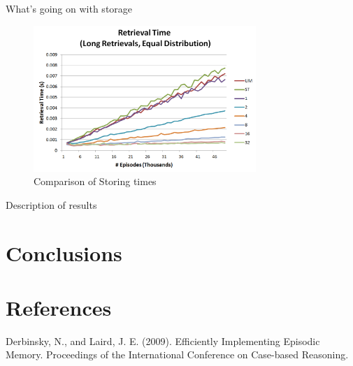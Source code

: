 \documentclass[11pt]{article} %
\begin{document}
What's going on with storage

\begin{figure}[h]
\caption{Comparison of Storing times}
\centering
\includegraphics[width=0.75\textwidth]{images/ret_worst_eq}
\end{figure}

Description of results


\section{Conclusions}

\section{References}

Derbinsky, N., and Laird, J. E. (2009). Efficiently Implementing Episodic
Memory. Proceedings of the International Conference on Case-based Reasoning.
\end{document}
